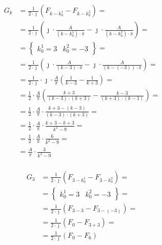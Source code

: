 \begin{task}
\begin{align*}
G_k &= \frac{1}{2\cdot \jmath} \left( F_{k-k^1_0} - F_{k-k^2_0} \right) =\\
 &= \frac{1}{2\cdot \jmath} \left( 
\jmath \cdot \frac{A}{\left(k-k^1_0\right) \cdot \pi}
 - \jmath \cdot \frac{A}{\left(k-k^2_0\right)\cdot \pi} \right) = \\
&=\left\{\begin{array}{ll}
k^1_0 = 3 & k^2_0 = -3
\end{array}\right\}=\\ 
&= \frac{1}{2\cdot \jmath} \left( 
\jmath \cdot \frac{A}{\left(k-3\right) \cdot \pi}
- \jmath \cdot \frac{A}{\left(k-\left(-3\right)\right)\cdot \pi} \right) = \\
&= \frac{1}{2\cdot \jmath} \cdot \jmath \cdot \frac{A}{\pi}\left( 
\frac{1}{k-3}
- \frac{1}{k+3} \right) = \\
&= \frac{1}{2} \cdot \frac{A}{\pi}\left( 
\frac{k+3}{\left(k-3\right)\cdot \left(k+3\right)}
- \frac{k-3}{\left(k+3\right)\cdot \left(k-1\right)} \right) = \\
&= \frac{1}{2} \cdot \frac{A}{\pi}\cdot 
\frac{k+3-\left(k-3\right)}{\left(k-3\right)\cdot \left(k+3\right)} = \\
&= \frac{1}{2} \cdot \frac{A}{\pi}\cdot 
\frac{k+3-k+3}{k^2-9} = \\
&= \frac{1}{2} \cdot \frac{A}{\pi}\cdot 
\frac{6}{k^2-9} = \\
&= \frac{A}{\pi}\cdot 
\frac{3}{k^2-9}\\
\end{align*}


\begin{align*}
G_3 &= \frac{1}{2\cdot \jmath} \left( F_{3-k^1_0} - F_{3-k^2_0} \right) = \\
&=\left\{\begin{array}{ll}
k^1_0 = 3 & k^2_0 = -3
\end{array}\right\}=\\ 
&= \frac{1}{2\cdot \jmath} \left( F_{3-3} - F_{3-\left(-3\right)} \right) =\\
&= \frac{1}{2\cdot \jmath} \left( F_{0} - F_{3+3} \right) =\\
&= \frac{1}{2\cdot \jmath} \left( F_{0} - F_{6} \right)
\end{align*}


\end{task}
